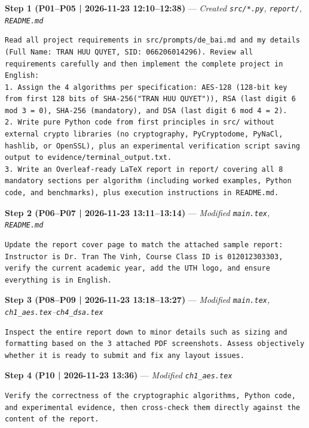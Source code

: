 \textbf{Step 1 (P01--P05 | 2026-11-23 12:10--12:38)} --- \textit{Created \texttt{src/*.py}, \texttt{report/}, \texttt{README.md}}
\begin{lstlisting}[style=promptstyle]
Read all project requirements in src/prompts/de_bai.md and my details (Full Name: TRAN HUU QUYET, SID: 066206014296). Review all requirements carefully and then implement the complete project in English:
1. Assign the 4 algorithms per specification: AES-128 (128-bit key from first 128 bits of SHA-256("TRAN HUU QUYET")), RSA (last digit 6 mod 3 = 0), SHA-256 (mandatory), and DSA (last digit 6 mod 4 = 2).
2. Write pure Python code from first principles in src/ without external crypto libraries (no cryptography, PyCryptodome, PyNaCl, hashlib, or OpenSSL), plus an experimental verification script saving output to evidence/terminal_output.txt.
3. Write an Overleaf-ready LaTeX report in report/ covering all 8 mandatory sections per algorithm (including worked examples, Python code, and benchmarks), plus execution instructions in README.md.
\end{lstlisting}

\textbf{Step 2 (P06--P07 | 2026-11-23 13:11--13:14)} --- \textit{Modified \texttt{main.tex}, \texttt{README.md}}
\begin{lstlisting}[style=promptstyle]
Update the report cover page to match the attached sample report: Instructor is Dr. Tran The Vinh, Course Class ID is 012012303303, verify the current academic year, add the UTH logo, and ensure everything is in English.
\end{lstlisting}

\textbf{Step 3 (P08--P09 | 2026-11-23 13:18--13:27)} --- \textit{Modified \texttt{main.tex}, \texttt{ch1\_aes.tex}--\texttt{ch4\_dsa.tex}}
\begin{lstlisting}[style=promptstyle]
Inspect the entire report down to minor details such as sizing and formatting based on the 3 attached PDF screenshots. Assess objectively whether it is ready to submit and fix any layout issues.
\end{lstlisting}

\textbf{Step 4 (P10 | 2026-11-23 13:36)} --- \textit{Modified \texttt{ch1\_aes.tex}}
\begin{lstlisting}[style=promptstyle]
Verify the correctness of the cryptographic algorithms, Python code, and experimental evidence, then cross-check them directly against the content of the report.
\end{lstlisting}

